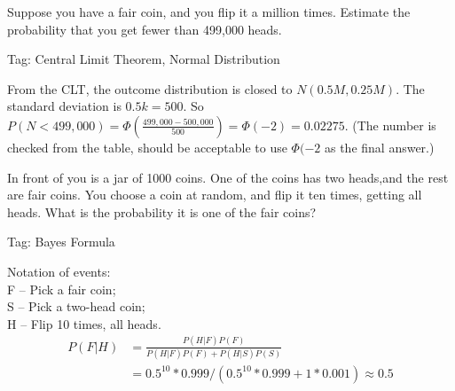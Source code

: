 \begin{exe}
Suppose you have a fair coin, and you flip it a million times. Estimate the probability that you get fewer than 499,000 heads.
\end{exe}
\begin{teacher}
Tag: Central Limit Theorem, Normal Distribution
\begin{sol}
From the CLT, the outcome distribution is closed to $N(0.5M, 0.25M)$. The standard deviation is $0.5k=500$. So $P(N<499,000) = \Phi(\frac{499,000 - 500, 000}{500}) = \Phi(-2) = 0.02275$. (The number is checked from the table, should be acceptable to use $\Phi(-2$ as the final answer.)
\end{sol}
\end{teacher}

\begin{exe}
In front of you is a jar of 1000 coins. One of the coins has two heads,and the rest are fair coins. You choose a coin at random, and flip it ten times, getting all heads. What is the probability it is one of the fair coins?
\end{exe}
\begin{teacher}
Tag: Bayes Formula
\begin{sol} 
Notation of events:\\
F -- Pick a fair coin;\\
S -- Pick a two-head coin;\\
H -- Flip 10 times, all heads.\\
\begin{equation*}
\begin{split}
    P(F|H) &= \frac{P(H|F)P(F)}{P(H|F)P(F) + P(H|S)P(S)}\\
    & = 0.5^{10}*0.999/(0.5^{10}*0.999+1*0.001) \approx 0.5
\end{split}
\end{equation*}
\end{sol}
\end{teacher}

